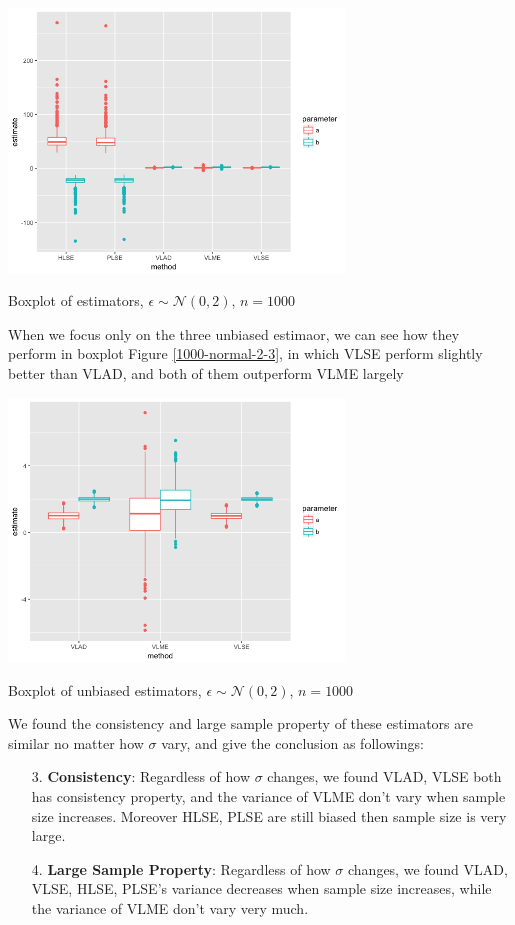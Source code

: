 \documentclass[twoside]{article}
\begin{document}
\begin{center}
\makeatletter
\def\@captype{figure}
\makeatother
\includegraphics [height=7cm]{code/n=1000,uniform,normal_2.png}
\caption{Boxplot of estimators, $\epsilon \sim \mathcal{N}(0,2)$, $n=1000$}
\label{1000-normal-2}
\end{center}

When we focus only on the three unbiased estimaor, we can see how they perform in boxplot Figure \ref{1000-normal-2-3}, in which VLSE perform slightly better than VLAD, and both of them outperform VLME largely

\begin{center}
\makeatletter
\def\@captype{figure}
\makeatother
\includegraphics [height=7cm]{code/special/n=1000,uniformed,normal_2,3.png}
\caption{Boxplot of unbiased estimators, $\epsilon \sim \mathcal{N}(0,2)$, $n=1000$}
\label{1000-normal-2-3}
\end{center}

We found the consistency and large sample property of these estimators are similar no matter how $\sigma$ vary, and give the conclusion as followings:

\begin{itemize}
  \item [3.] \textbf{Consistency}: Regardless of how $\sigma$ changes, we found VLAD, VLSE both has consistency property, and the variance of VLME don't vary when sample size increases. Moreover HLSE, PLSE are still biased then sample size is very large.
  \item [4.] \textbf{Large Sample Property}: Regardless of how $\sigma$ changes, we found VLAD, VLSE, HLSE, PLSE's variance decreases when sample size increases, while the variance of VLME don't vary very much.
\end{itemize}
\end{document}
